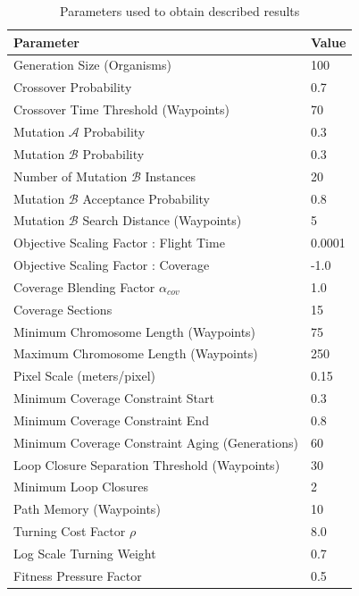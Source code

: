 \documentclass[letterpaper, 10 pt, conference]{ieeeconf}  %
\begin{document}
\begin{table}
  \caption{Parameters used to obtain described results}
\begin{tabular}{l|l}
\hline
\multicolumn{1}{|l|}{Parameter}                 & \multicolumn{1}{l|}{Value} \\ \hline
Generation Size (Organisms)                        & 100                     \\
Crossover Probability                              & 0.7                     \\
Crossover Time Threshold (Waypoints)               & 70                      \\
Mutation $\mathcal{A}$ Probability                 & 0.3                     \\
Mutation $\mathcal{B}$ Probability                 & 0.3                     \\
Number of Mutation $\mathcal{B}$ Instances         & 20                      \\
Mutation $\mathcal{B}$ Acceptance Probability      & 0.8                     \\
Mutation $\mathcal{B}$ Search Distance (Waypoints) & 5                       \\
Objective Scaling Factor : Flight Time             & 0.0001                  \\
Objective Scaling Factor : Coverage                & -1.0                    \\
Coverage Blending Factor $\alpha_{cov}$            & 1.0                     \\
Coverage Sections                                  & 15                      \\
Minimum Chromosome Length (Waypoints)              & 75                      \\
Maximum Chromosome Length (Waypoints)              & 250                     \\
Pixel Scale (meters/pixel)                         & 0.15                    \\
Minimum Coverage Constraint Start                  & 0.3                     \\
Minimum Coverage Constraint End                    & 0.8                     \\
Minimum Coverage Constraint Aging (Generations)    & 60                      \\
Loop Closure Separation Threshold (Waypoints)      & 30                      \\
Minimum Loop Closures                              & 2                       \\
Path Memory (Waypoints)                            & 10                      \\
Turning Cost Factor $\rho$                         & 8.0                     \\
Log Scale Turning Weight                           & 0.7                     \\
Fitness Pressure Factor                            & 0.5                     \\

\end{tabular}
\label{tab:parameters}
\end{table}
\end{document}
